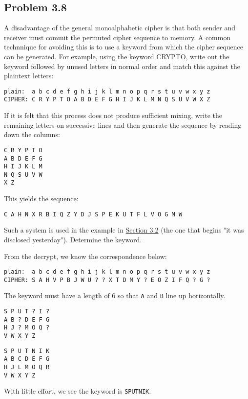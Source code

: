 \documentclass[../hw_sols.tex]{subfiles}
\begin{document}
\subsection*{Problem 3.8}

A disadvantage of the general monoalphabetic cipher is that both sender and 
receiver must commit the permuted cipher sequence to memory. A common 
technnique for avoiding this is to use a keyword from which the cipher 
sequence can be generated. For example, using the keyword CRYPTO, write out 
the keyword followed by unused letters in normal order and match this against 
the plaintext letters:
\begin{Verbatim}
plain:  a b c d e f g h i j k l m n o p q r s t u v w x y z
CIPHER: C R Y P T O A B D E F G H I J K L M N Q S U V W X Z
\end{Verbatim}

If it is felt that this process does not produce sufficient mixing, write the 
remaining letters on successive lines and then generate the sequence by 
reading down the columns:
\begin{Verbatim}[xleftmargin=3cm]
C R Y P T O
A B D E F G
H I J K L M
N Q S U V W
X Z
\end{Verbatim}

This yields the sequence:
\begin{Verbatim}
C A H N X R B I Q Z Y D J S P E K U T F L V O G M W
\end{Verbatim}

Such a system is used in the example in 
\href{run:../Cryptography and Network Security.pdf}{Section 3.2} (the one 
that begins "it was disclosed yesterday"). Determine the keyword.

\begin{solution}

From the decrypt, we know the correspondence below:
\begin{Verbatim}
plain:  a b c d e f g h i j k l m n o p q r s t u v w x y z
CIPHER: S A H V P B J W U ? ? X T D M Y ? E O Z I F Q ? G ?	
\end{Verbatim}

The keyword must have a length of 6 so that \verb|A| and \verb|B| 
line up horizontally.

\begin{minipage}{0.2\linewidth}
\begin{Verbatim}
S P U T ? I ?
A B ? D E F G
H J ? M O Q ?
V W X Y Z    
\end{Verbatim}
\end{minipage}
\qquad {\Huge $\Rightarrow$} \qquad
\begin{minipage}{0.2\linewidth}
\begin{Verbatim}
S P U T N I K
A B C D E F G
H J L M O Q R
V W X Y Z
\end{Verbatim}
\end{minipage}

With little effort, we see the keyword is \verb|SPUTNIK|.

\end{solution}
\end{document}
